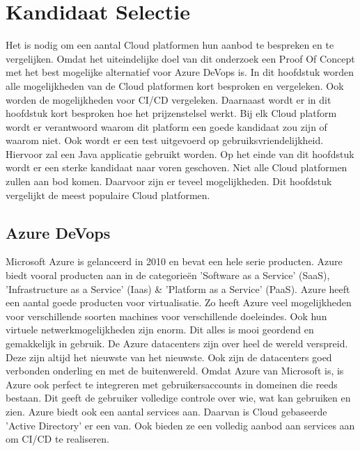 \chapter{Kandidaat Selectie}
\label{ch:kandidaatselectie}
Het is nodig om een aantal Cloud platformen hun aanbod te bespreken en te vergelijken. Omdat het uiteindelijke doel van dit onderzoek een Proof Of Concept met het best mogelijke alternatief voor Azure DeVops is. In dit hoofdstuk worden alle mogelijkheden van de Cloud platformen kort besproken en vergeleken. Ook worden de mogelijkheden voor CI/CD vergeleken. Daarnaast wordt er in dit hoofdstuk kort besproken hoe het prijzenstelsel werkt. Bij elk Cloud platform wordt er verantwoord waarom dit platform een goede kandidaat zou zijn of waarom niet. Ook wordt er een test uitgevoerd op gebruiksvriendelijkheid. Hiervoor zal een Java applicatie gebruikt worden. Op het einde van dit hoofdstuk wordt er een sterke kandidaat naar voren geschoven. Niet alle Cloud platformen zullen aan bod komen. Daarvoor zijn er teveel mogelijkheden. Dit hoofdstuk vergelijkt de meest populaire Cloud platformen.

\section{Azure DeVops}
\label{sec:azuredevops}
Microsoft Azure is gelanceerd in 2010 en bevat een hele serie producten. Azure biedt vooral producten aan in de categorieën 'Software as a Service' (SaaS), 'Infrastructure as a Service' (Iaas) \& 'Platform as a Service' (PaaS). Azure heeft een aantal goede producten voor virtualisatie. Zo heeft Azure veel mogelijkheden voor verschillende soorten machines voor verschillende doeleindes. Ook hun virtuele netwerkmogelijkheden zijn enorm. Dit alles is mooi geordend en gemakkelijk in gebruik. De Azure datacenters zijn over heel de wereld verspreid. Deze zijn altijd het nieuwste van het nieuwste. Ook zijn de datacenters goed verbonden onderling en met de buitenwereld. Omdat Azure van Microsoft is, is Azure ook perfect te integreren met gebruikersaccounts in domeinen die reeds bestaan. Dit geeft de gebruiker volledige controle over wie, wat kan gebruiken en zien. Azure biedt ook een aantal services aan. Daarvan is Cloud gebaseerde 'Active Directory' er een van. Ook bieden ze een volledig aanbod aan services aan om CI/CD te realiseren.

